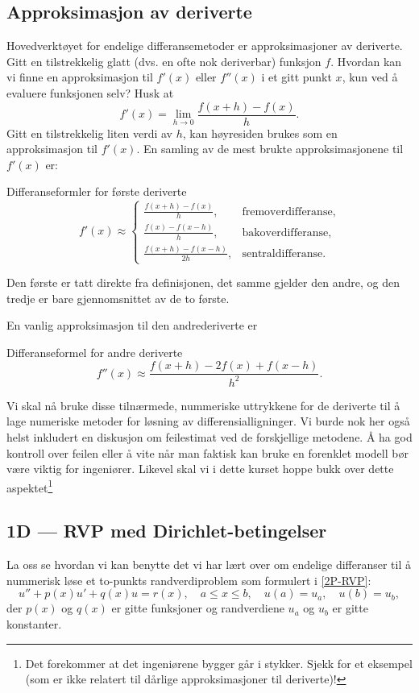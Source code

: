 \subsection{Approksimasjon av deriverte}
Hovedverktøyet for endelige differansemetoder er approksimasjoner av deriverte.
Gitt en tilstrekkelig glatt (dvs. en ofte nok deriverbar) funksjon \( f \). Hvordan kan vi finne en approksimasjon til \( f'(x) \) eller \( f''(x) \) i et gitt punkt \( x \), kun ved å evaluere funksjonen selv? Husk at
\[
f'(x) = \lim_{h \to 0} \frac{f(x + h) - f(x)}{h}.
\]
Gitt en tilstrekkelig liten verdi av \( h \), kan høyresiden brukes som en approksimasjon til \( f'(x) \).
En samling av de mest brukte approksimasjonene til \( f'(x) \) er:
\begin{defn}{Differanseformler for første deriverte}
    \[
f'(x) \approx
\begin{cases}
\displaystyle \frac{f(x + h) - f(x)}{h}, & \text{fremoverdifferanse}, \\
\displaystyle \frac{f(x) - f(x - h)}{h}, & \text{bakoverdifferanse}, \\
\displaystyle \frac{f(x + h) - f(x - h)}{2h}, & \text{sentraldifferanse}.
\end{cases}
\]
\end{defn}
Den første er tatt direkte fra definisjonen, det samme gjelder den andre, og den tredje er bare gjennomsnittet av de to første.

En vanlig approksimasjon til den andrederiverte er
\begin{defn}{Differanseformel for andre deriverte}
\[
f''(x) \approx \frac{f(x + h) - 2f(x) + f(x - h)}{h^2}.
\]
\end{defn}
Vi skal nå bruke disse tilnærmede, nummeriske uttrykkene for de deriverte til å lage numeriske metoder for løsning av differensialligninger. Vi burde nok her også helst inkludert en diskusjon om feilestimat ved de forskjellige metodene. Å ha god kontroll over feilen eller å vite når man faktisk kan bruke en forenklet modell bør være viktig for ingeniører. Likevel skal vi i dette kurset hoppe bukk over dette aspektet\footnote{Det forekommer at  det ingeniørene bygger går i stykker. Sjekk \cite{TNB15} for et eksempel (som er ikke relatert til dårlige approksimasjoner til deriverte)!}

\subsection{1D — RVP med Dirichlet-betingelser}
La oss se hvordan vi kan benytte det vi har lært over om endelige differanser til å nummerisk løse et to-punkts randverdiproblem som formulert i \eqref{2P-RVP}:
\[
u'' + p(x)u' + q(x)u = r(x), \quad a \leq x \leq b, \quad u(a) = u_a, \quad u(b) = u_b,
\]
der \( p(x) \) og \( q(x) \) er gitte funksjoner og randverdiene \( u_a \) og \( u_b \) er gitte konstanter.

